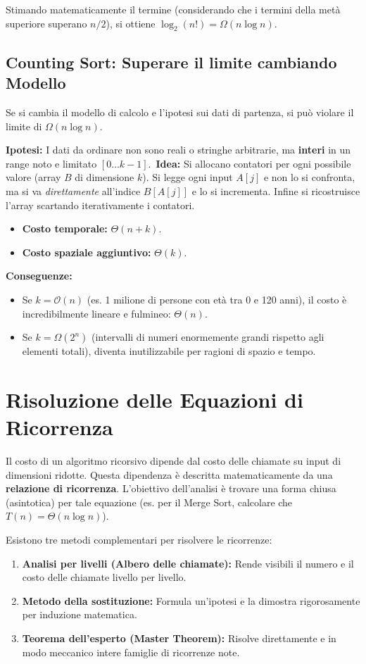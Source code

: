 \documentclass[12pt, a4paper]{article}
\begin{document}
Stimando matematicamente il termine (considerando che i termini della metà superiore superano $n/2$), si ottiene $\log_2(n!) = \Omega(n \log n)$.

\subsection{Counting Sort: Superare il limite cambiando Modello}
Se si cambia il modello di calcolo e l'ipotesi sui dati di partenza, si può violare il limite di $\Omega(n \log n)$.

\textbf{Ipotesi:} I dati da ordinare non sono reali o stringhe arbitrarie, ma \textbf{interi} in un range noto e limitato $[0 \dots k-1]$.\
\textbf{Idea:} Si allocano contatori per ogni possibile valore (array $B$ di dimensione $k$). Si legge ogni input $A[j]$ e non lo si confronta, ma si va \textit{direttamente} all'indice $B[A[j]]$ e lo si incrementa. Infine si ricostruisce l'array scartando iterativamente i contatori.
\begin{itemize}
\item \textbf{Costo temporale:} $\Theta(n + k)$.
\item \textbf{Costo spaziale aggiuntivo:} $\Theta(k)$.
\end{itemize}
\textbf{Conseguenze:}
\begin{itemize}
\item Se $k = \mathcal{O}(n)$ (es. 1 milione di persone con età tra 0 e 120 anni), il costo è incredibilmente lineare e fulmineo: \textbf{$\Theta(n)$}.
\item Se $k = \Omega(2^n)$ (intervalli di numeri enormemente grandi rispetto agli elementi totali), diventa inutilizzabile per ragioni di spazio e tempo.
\end{itemize}



\section{Risoluzione delle Equazioni di Ricorrenza}

Il costo di un algoritmo ricorsivo dipende dal costo delle chiamate su input di dimensioni ridotte. Questa dipendenza è descritta matematicamente da una \textbf{relazione di ricorrenza}. L'obiettivo dell'analisi è trovare una forma chiusa (asintotica) per tale equazione (es. per il Merge Sort, calcolare che $T(n) = \Theta(n \log n)$).

Esistono tre metodi complementari per risolvere le ricorrenze:
\begin{enumerate}
\item \textbf{Analisi per livelli (Albero delle chiamate):} Rende visibili il numero e il costo delle chiamate livello per livello.
\item \textbf{Metodo della sostituzione:} Formula un'ipotesi e la dimostra rigorosamente per induzione matematica.
\item \textbf{Teorema dell'esperto (Master Theorem):} Risolve direttamente e in modo meccanico intere famiglie di ricorrenze note.
\end{enumerate}
\end{document}
